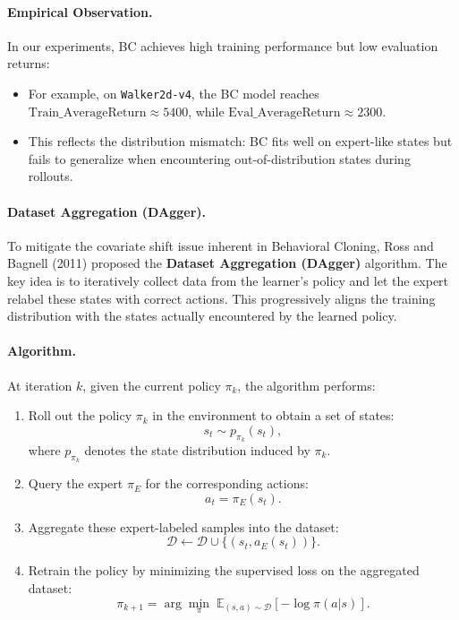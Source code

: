 \documentclass[12pt]{article}
\begin{document}
\paragraph{Empirical Observation.}
In our experiments, BC achieves high training performance but low evaluation returns:
\begin{itemize}
    \item For example, on \texttt{Walker2d-v4}, the BC model reaches $\text{Train\_AverageReturn} \approx 5400$, 
    while $\text{Eval\_AverageReturn} \approx 2300$.
    \item This reflects the distribution mismatch: BC fits well on expert-like states but fails to generalize when encountering out-of-distribution states during rollouts.
\end{itemize}

\paragraph{Dataset Aggregation (DAgger).}
To mitigate the covariate shift issue inherent in Behavioral Cloning, 
Ross and Bagnell (2011) proposed the \textbf{Dataset Aggregation (DAgger)} algorithm. 
The key idea is to iteratively collect data from the learner's policy and let the expert relabel these states with correct actions. 
This progressively aligns the training distribution with the states actually encountered by the learned policy.

\paragraph{Algorithm.}
At iteration $k$, given the current policy $\pi_k$, the algorithm performs:
\begin{enumerate}
    \item Roll out the policy $\pi_k$ in the environment to obtain a set of states:
    \[
    s_t \sim p_{\pi_k}(s_t),
    \]
    where $p_{\pi_k}$ denotes the state distribution induced by $\pi_k$.
    \item Query the expert $\pi_E$ for the corresponding actions:
    \[
    a_t = \pi_E(s_t).
    \]
    \item Aggregate these expert-labeled samples into the dataset:
    \[
    \mathcal{D} \leftarrow \mathcal{D} \cup \{(s_t, a_E(s_t))\}.
    \]
    \item Retrain the policy by minimizing the supervised loss on the aggregated dataset:
    \[
    \pi_{k+1} = \arg\min_{\pi} \; \mathbb{E}_{(s,a)\sim\mathcal{D}}[ -\log \pi(a|s) ].
    \]
\end{enumerate}
\end{document}
